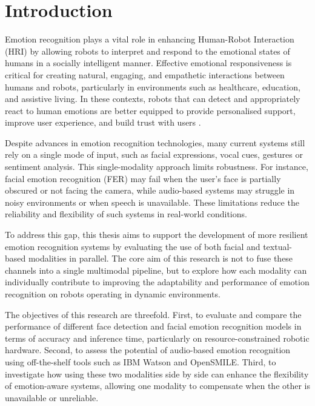 \chapter{Introduction}

Emotion recognition plays a vital role in enhancing Human-Robot Interaction (HRI) by allowing robots to interpret and respond to the emotional states of humans in a socially intelligent manner. Effective emotional responsiveness is critical for creating natural, engaging, and empathetic interactions between humans and robots, particularly in environments such as healthcare, education, and assistive living. In these contexts, robots that can detect and appropriately react to human emotions are better equipped to provide personalised support, improve user experience, and build trust with users \cite{Breazeal2003-sa, Castellano2009-cv}.

Despite advances in emotion recognition technologies, many current systems still rely on a single mode of input, such as facial expressions, vocal cues, gestures or sentiment analysis. This single-modality approach limits robustness. For instance, facial emotion recognition (FER) may fail when the user's face is partially obscured or not facing the camera, while audio-based systems may struggle in noisy environments or when speech is unavailable. These limitations reduce the reliability and flexibility of such systems in real-world conditions.

To address this gap, this thesis aims to support the development of more resilient emotion recognition systems by evaluating the use of both facial and textual-based modalities in parallel. The core aim of this research is not to fuse these channels into a single multimodal pipeline, but to explore how each modality can individually contribute to improving the adaptability and performance of emotion recognition on robots operating in dynamic environments.

The objectives of this research are threefold. First, to evaluate and compare the performance of different face detection and facial emotion recognition models in terms of accuracy and inference time, particularly on resource-constrained robotic hardware. Second, to assess the potential of audio-based emotion recognition using off-the-shelf tools such as IBM Watson and OpenSMILE. Third, to investigate how using these two modalities side by side can enhance the flexibility of emotion-aware systems, allowing one modality to compensate when the other is unavailable or unreliable.

